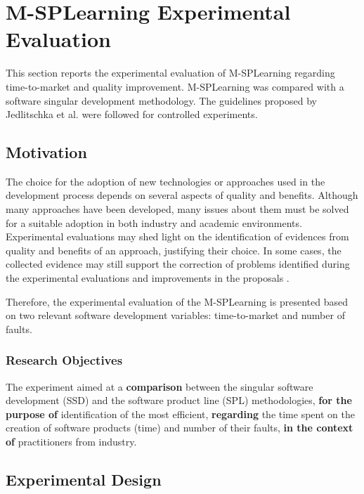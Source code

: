 
\section{M-SPLear\allowbreak ning Experimental Evaluation}\label{section4}

This section reports the experimental evaluation of M-SPLear\allowbreak ning regarding time-to-market and quality improvement. M-SPLear\allowbreak ning was compared with a software singular development methodology. The guidelines proposed by Jedlitschka et al. \cite{jedlitschka07} were followed for controlled experiments.

\subsection{Motivation}\label{sub:motivation}


The choice for the adoption of new technologies or approaches used in the development process depends on several aspects of quality and benefits. Although many approaches have been developed, many issues about them must be solved for a suitable adoption in both industry and academic environments. Experimental evaluations may shed light on the identification of evidences from quality and benefits of an approach, justifying their choice. In some cases, the collected evidence may still support the correction of problems identified during the experimental evaluations and improvements in the proposals \cite{wohlin12,juristo10}.

Therefore, the experimental evaluation of the M-SPLear\allowbreak ning is presented based on two relevant software development variables: time-to-market and number of faults.

\subsubsection{Research Objectives}\label{sub:object}

The experiment aimed at a \textbf{comparison} between the singular software development (SSD) and the software product line (SPL) methodologies, \textbf{for the purpose of} identification of the most efficient, \textbf{regarding} the time spent on the creation of software products (time) and number of their faults, \textbf{in the context of} practitioners from industry.


\subsection{Experimental Design}\label{sub:design}

